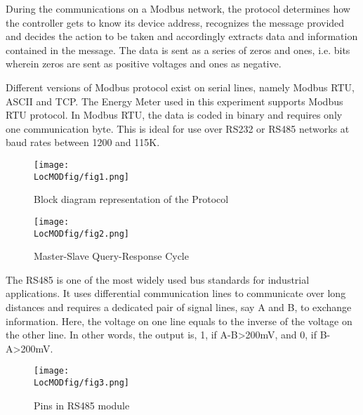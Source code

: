 During the communications on a Modbus  network, the protocol determines how the controller gets to know its device address, recognizes the message provided and decides the action to be taken and accordingly extracts data and information contained in the message. The data is sent as a series of zeros and ones, i.e. bits wherein zeros are sent as positive voltages and ones as negative.

Different versions of Modbus protocol exist on serial lines, namely Modbus RTU, ASCII and TCP. The Energy Meter used in this experiment supports Modbus RTU protocol. In Modbus RTU, the data is coded in binary and requires only one communication byte. This is ideal for use over RS232 or RS485 networks at baud rates between 1200 and 115K.

\begin{figure}
\centering
\texttt{[image: \\LocMODfig/fig1.png]}
\label{fig:mod-block}
\caption{Block diagram representation of the Protocol}
\end{figure}


\begin{figure}
\centering
\texttt{[image: \\LocMODfig/fig2.png]}
\caption{Master-Slave Query-Response Cycle}
\label{fig:mod-master-slave}
\end{figure}

The RS485 is one of the most widely used bus standards for industrial
applications. It uses differential communication lines to communicate
over long distances and requires a dedicated pair of signal lines, say
A and B, to exchange information. Here, the voltage on one line equals
to the inverse of the voltage on the other line. In other words, the
output is,
1, if A-B\textgreater200mV, and 0, if B-A\textgreater200mV.




\begin{figure}
\centering
\texttt{[image: \\LocMODfig/fig3.png]}
\caption{Pins in RS485 module}
\label{fig:rs-485}
\end{figure}

